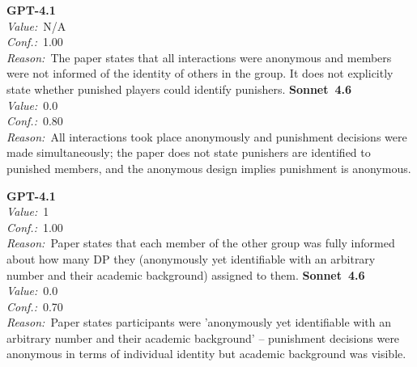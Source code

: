 \documentclass[11pt,a4paper]{article}
\begin{document}
\begin{tcolorbox}[
  title={\textbf{CONFIG\_showPunishmentId} \textbar{} DOI: 10.1038\_415137a \textbar{} Cond.~1},
  colback=blue!3!white,
  colframe=blue!45!black,
  fonttitle=\small\sffamily,
  sidebyside,
  sidebyside align=top seam,
  lower separated=false,
  breakable,
  before upper={\small},
  before lower={\small},
]
\textbf{GPT-4.1}\\[2pt]
\textit{Value:}~N/A\\[3pt]
\textit{Conf.:}~1.00\\[3pt]
\textit{Reason:}~The paper states that all interactions were anonymous and members were not informed of the identity of others in the group. It does not explicitly state whether punished players could identify punishers.
\tcblower
\textbf{Sonnet~4.6}\\[2pt]
\textit{Value:}~0.0\\[3pt]
\textit{Conf.:}~0.80\\[3pt]
\textit{Reason:}~All interactions took place anonymously and punishment decisions were made simultaneously; the paper does not state punishers are identified to punished members, and the anonymous design implies punishment is anonymous.
\end{tcolorbox}

\begin{tcolorbox}[
  title={\textbf{CONFIG\_showPunishmentId} \textbar{} DOI: 10.1038\_s41598-023-33167-2 \textbar{} Cond.~4},
  colback=blue!3!white,
  colframe=blue!45!black,
  fonttitle=\small\sffamily,
  sidebyside,
  sidebyside align=top seam,
  lower separated=false,
  breakable,
  before upper={\small},
  before lower={\small},
]
\textbf{GPT-4.1}\\[2pt]
\textit{Value:}~1\\[3pt]
\textit{Conf.:}~1.00\\[3pt]
\textit{Reason:}~Paper states that each member of the other group was fully informed about how many DP they (anonymously yet identifiable with an arbitrary number and their academic background) assigned to them.
\tcblower
\textbf{Sonnet~4.6}\\[2pt]
\textit{Value:}~0.0\\[3pt]
\textit{Conf.:}~0.70\\[3pt]
\textit{Reason:}~Paper states participants were 'anonymously yet identifiable with an arbitrary number and their academic background' -- punishment decisions were anonymous in terms of individual identity but academic background was visible.
\end{tcolorbox}
\end{document}
